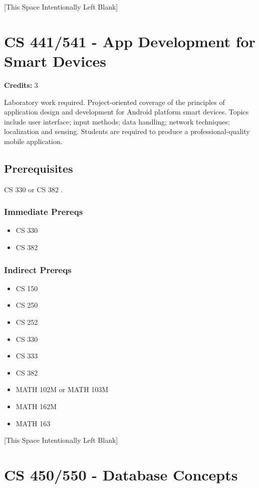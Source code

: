 \documentclass[]{article}
\providecommand{\tightlist}{%
  \setlength{\itemsep}{0pt}\setlength{\parskip}{0pt}}
\newcommand{\pagebreakhere}{
\vspace*{\fill}
\begin{center}
[This Space Intentionally Left Blank]
\end{center}
\vspace*{\fill}
\newpage
}
\begin{document}
\pagebreakhere
\section{CS 441/541 - App Development for Smart
Devices}\label{cs-441541---app-development-for-smart-devices}

\textbf{Credits:} 3

Laboratory work required. Project-oriented coverage of the principles of
application design and development for Android platform smart devices.
Topics include user interface; input methods; data handling; network
techniques; localization and sensing. Students are required to produce a
professional-quality mobile application.

\subsection{Prerequisites}\label{prerequisites-32}

CS 330 or CS 382 .

\subsubsection{Immediate Prereqs}\label{immediate-prereqs-24}

\begin{itemize}
\tightlist
\item
  CS 330
\item
  CS 382
\end{itemize}

\subsubsection{Indirect Prereqs}\label{indirect-prereqs-24}

\begin{itemize}
\tightlist
\item
  CS 150
\item
  CS 250
\item
  CS 252
\item
  CS 330
\item
  CS 333
\item
  CS 382
\item
  MATH 102M or MATH 103M
\item
  MATH 162M
\item
  MATH 163
\end{itemize}

\pagebreakhere
\section{CS 450/550 - Database
Concepts}\label{cs-450550---database-concepts}
\end{document}
